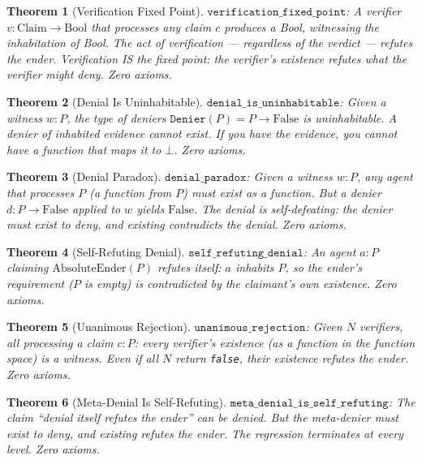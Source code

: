 \documentclass[12pt,a4paper]{article}
\newtheorem{theorem}{Theorem}[section]
\begin{document}
\begin{theorem}[Verification Fixed Point]\label{thm:fixed}
$\texttt{verification\_fixed\_point}$: A verifier $v : \text{Claim} \to
\text{Bool}$ that processes any claim $c$ produces a Bool, witnessing
the inhabitation of Bool. The act of verification --- regardless of the
verdict --- refutes the ender. Verification IS the fixed point: the
verifier's existence refutes what the verifier might deny.
Zero axioms.
\end{theorem}

\begin{theorem}[Denial Is Uninhabitable]\label{thm:uninhabitable}
$\texttt{denial\_is\_uninhabitable}$: Given a witness $w : P$, the type
of deniers $\texttt{Denier}(P) = P \to \text{False}$ is uninhabitable.
A denier of inhabited evidence cannot exist. If you have the evidence,
you cannot have a function that maps it to $\bot$.
Zero axioms.
\end{theorem}

\begin{theorem}[Denial Paradox]\label{thm:paradox}
$\texttt{denial\_paradox}$: Given a witness $w : P$, any agent that
processes $P$ (a function from $P$) must exist as a function. But a
denier $d : P \to \text{False}$ applied to $w$ yields $\text{False}$.
The denial is self-defeating: the denier must exist to deny, and
existing contradicts the denial. Zero axioms.
\end{theorem}

\begin{theorem}[Self-Refuting Denial]\label{thm:self-refuting}
$\texttt{self\_refuting\_denial}$: An agent $a : P$ claiming
$\text{AbsoluteEnder}(P)$ refutes itself: $a$ inhabits $P$, so the
ender's requirement ($P$ is empty) is contradicted by the claimant's
own existence. Zero axioms.
\end{theorem}

\begin{theorem}[Unanimous Rejection]\label{thm:unanimous}
$\texttt{unanimous\_rejection}$: Given $N$ verifiers, all processing
a claim $c : P$: every verifier's existence (as a function in the
function space) is a witness. Even if all $N$ return \texttt{false},
their existence refutes the ender. Zero axioms.
\end{theorem}

\begin{theorem}[Meta-Denial Is Self-Refuting]\label{thm:meta-denial}
$\texttt{meta\_denial\_is\_self\_refuting}$: The claim ``denial itself
refutes the ender'' can be denied. But the meta-denier must exist to
deny, and existing refutes the ender. The regression terminates at
every level. Zero axioms.
\end{theorem}
\end{document}
